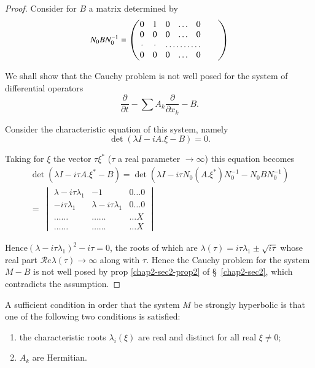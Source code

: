 \begin{proof}
Consider for $ B$ a matrix determined by 
$$
N_0 B N^{-1}_0 =
\begin{pmatrix} 
0 & 1 & 0 & \ldots & 0\\ 
0 & 0 & 0 & \ldots & 0\\ 
\cdot & \cdot & \hdotsfor{3} & &  \\ 
0 & 0 & 0 & \ldots  & 0\\ 
\end{pmatrix} 
$$

We shall show that the Cauchy problem is not well posed for the
system  of differential operators  
$$
\frac{\partial}{\partial t} - \sum A_k \frac{\partial} {\partial x_k}
- B. 
$$

Consider the characteristic equation of this system, namely 
$$
\det(\lambda I - iA. \xi - B  ) = 0.
$$

Taking for $\xi$ the vector $\tau \xi^*$ ($\tau$ a real parameter
 $\rightarrow \infty$) this equation becomes  
\begin{gather*}
\det(\lambda I - i\tau A. \xi^* - B ) = \det(\lambda I - i\tau N_0
(A.\xi^*) N_0^{-1}-N_0 B N^{-1}_0)  \\ 
= ~ \begin{vmatrix}
 \lambda-i \tau \lambda_1 & -1 & 0 \ldots 0\\ 
-i  \tau \lambda_1 & \lambda-i \tau \lambda_1 & 0 \ldots 0\\
\ldots\ldots & \ldots\ldots & \ldots X \\ 
\ldots\ldots & \ldots\ldots & \ldots X 
\end{vmatrix} 
\end{gather*}

Hence\pageoriginale $(\lambda - i \tau \lambda_1)^2 - i \tau = 0$, the
roots of 
which  are $\lambda (\tau) = i \tau \lambda_1 \pm \sqrt{i\tau}$ whose
real part $\mathcal{R} e \lambda (\tau) \to \infty $ along with
$\tau$. Hence the Cauchy problem for the system $M-B$ is not well
posed by prop \ref{chap2-sec2-prop2} of \S\ \ref{chap2-sec2}, 
which contradicts the assumption. 
\end{proof}

\begin{proposition}\label{chap2-sec5-prop2}%
A sufficient condition in order that the system $M$ be  strongly
hyperbolic is that one of the following two conditions is satisfied:  
\begin{enumerate}[\rm(i)]
\item the characteristic roots $\lambda_i (\xi ) $ are real and
  distinct for all real $\xi \neq 0$; 

\item  $A_k$ are Hermitian. 
\end{enumerate}
\end{proposition}

